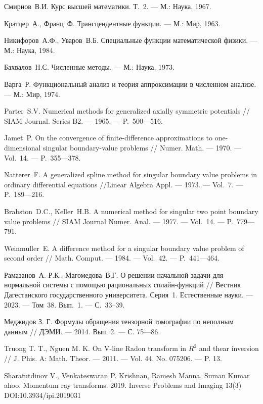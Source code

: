 \begin{thebibliography}{111}
 Смирнов~В.И. Курс высшей математики. Т.~2.
--- М.: Наука, 1967. 

 Кратцер~А., Франц~Ф. Трансцендентные функции.
 --- М.: Мир, 1963.

 Никифоров~А.Ф., Уваров~В.Б. Специальные функции математической физики.
 --- М.: Наука, 1984.

  Бахвалов~Н.С. Численные методы.
--- М.: Наука, 1973. 

  Варга~Р. Функциональный анализ и теория аппроксимации
в численном анализе. --- М.: Мир, 1974. 

 Parter~S.V. Numerical methods for generalized axially symmetric potentials
 // SIAM Journal. Series B2.  --- 1965.  --- P.~500---516.

  Jamet~P. On the convergence of finite-difference 
approximations to one-dimensional singular boundary-value problems
 // Numer. Math.  --- 1970. --- Vol.~14. --- P.~355---378.

  Natterer~F. A generalized spline method for singular boundary value problems in ordinary differential equations
 //Linear Algebra Appl. --- 1973. --- Vol.~7. --- P.~189---216.

 Brabston~D.C., Keller~H.B. A numerical method for singular
 two point  boundary value problems
 // SIAM Journal Numer. Anal. --- 1977. --- Vol.~14. --- P.~779---791.

  Weinmuller~E. A difference  method for a singular
 boundary value problem of second order
 // Math. Comput. --- 1984. --- Vol.~42. --- P.~441---464. 
 
 Рамазанов~А.-Р.К., Магомедова~В.Г. О решении начальной задачи для 
нормальной системы с помощью рациональных сплайн-функций // Вестник Дагестанского 
государственного университета. Серия~1. Естественные науки. --- 2023. --- Том~38. Вып.~1. 
--- С.~33--39. 


  Меджидов З. Г. Формулы обращения тензорной томографии по неполным данным // ДЭМИ. --- 2014. Вып. 2. --- С. 75---86.

 Truong T. T., Nguen M. K. On V-line Radon transform in $R^2$   and thear inversion // J. Phis. A: Math. Theor. --- 2011. --- Vol. 44. No. 075206. --- P. 13.

 Sharafutdinov V., Venkateswaran P. Krishnan, Ramesh Manna, Suman Kumar ahoo. Momentum ray transforms. 2019. Inverse Problems and Imaging 13(3) DOI:10.3934/ipi.2019031


\end{thebibliography}
